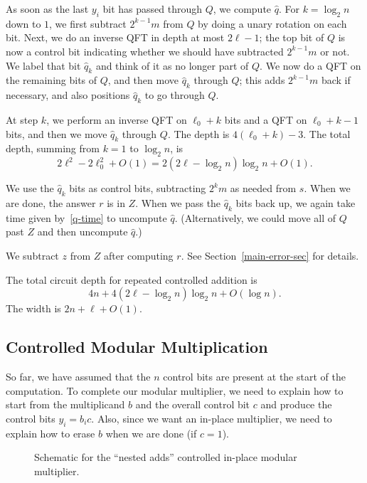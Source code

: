 \documentclass{article} %
\newcommand{\caps}[1]{{\sc #1}}
\newcommand{\QFT}{\caps{QFT}\xspace}
\begin{document}
As soon as the last $y_i$ bit has passed through $Q$, we compute $\hat{q}$.
For $k = \log_2 n$ down to $1$, we first subtract $2^{k-1} m$ from
$Q$ by doing a unary rotation on each bit.  Next, we do an inverse \QFT in
depth at most $2\ell-1$;
the top bit of $Q$ is now a control bit indicating whether
we should have subtracted $2^{k-1} m$ or not.  We label that bit $\hat{q}_k$
and think of it as no longer part of $Q$.  We now do a \QFT on the
remaining bits of $Q$, and then move $\hat{q}_k$ through $Q$; this adds
$2^{k-1}m$ back if necessary, and also positions $\hat{q}_k$ to go through
$Q$.

At step $k$, we perform an inverse \QFT on $\ell_0 + k$ bits and
a \QFT on $\ell_0 + k - 1$ bits, and then we move $\hat{q}_k$ through $Q$.
The depth is $4(\ell_0 + k) - 3$.  The total depth, summing from
$k = 1$ to $\log_2 n$, is
\begin{equation}
\label{q-time}
2\ell^2 - 2\ell_0^2 + O(1) = 2 (2\ell - \log_2 n) \log_2 n + O(1).
\end{equation}

We use the $\hat{q}_k$ bits as control bits, subtracting $2^k m$ as
needed from $s$.  When we are done, the answer $r$ is in $Z$.  When we
pass the $\hat{q}_k$ bits back up, we again take time given
by~\eqref{q-time} to uncompute $\hat{q}$.  (Alternatively, we could
move all of $Q$ past $Z$ and then uncompute $\hat{q}$.)

We subtract $z$ from $Z$ after computing $r$.  See
Section~\ref{main-error-sec} for details.

The total circuit depth for repeated controlled addition is
$$
4n + 4 (2\ell - \log_2 n) \log_2 n + O(\log n).
$$
The width is $2n + \ell + O(1)$.

\subsection{Controlled Modular Multiplication}
\label{main-control-sec}

So far, we have assumed that the $n$ control bits are present at the
start of the computation.  To complete our modular multiplier, we need
to explain how to start from the multiplicand $b$ and
the overall control bit $c$ and produce the control bits $y_i = b_i c$.
Also, since we want an in-place multiplier, we need to explain how to
erase $b$ when we are done (if $c=1$).

\begin{sidewaysfigure}
\begin{center}

\end{center}
\caption{Schematic for the ``nested adds'' controlled in-place
modular multiplier.}
\label{nested-mod-mult-fig}
\end{sidewaysfigure}
\end{document}
